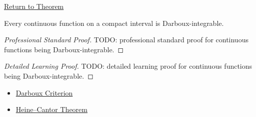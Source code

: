 \newpage
{}
\label{prf:continuous-darboux-integrable}

\begin{remark*}[Return]
\hyperref[thm:continuous-darboux-integrable]{Return to Theorem}
\end{remark*}

\begin{theorem*}
Every continuous function on a compact interval is Darboux-integrable.
\end{theorem*}

\begin{proof}[Professional Standard Proof]
\LRAProofBodyStart
TODO: professional standard proof for continuous functions being Darboux-integrable.
\end{proof}

\begin{proof}[Detailed Learning Proof]
\LRAProofBodyStart
TODO: detailed learning proof for continuous functions being Darboux-integrable.
\end{proof}

\begin{remark*}
\end{remark*}

\begin{dependencies}
\begin{itemize}
  \item \hyperref[thm:darboux-criterion]{Darboux Criterion}
  \item \hyperref[thm:heine-cantor]{Heine--Cantor Theorem}
\end{itemize}
\end{dependencies}

\clearpage
